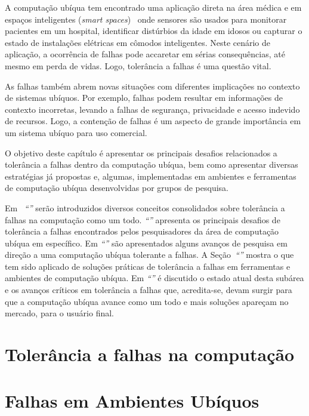 \documentclass{SBCbookchapter}
\begin{document}
A computação ubíqua tem encontrado uma aplicação direta na área médica\linebreak\cite{Bang03} e em espaços inteligentes (\emph{smart spaces})~\cite{Kidd99} onde sensores são usados para monitorar pacientes em um hospital, identificar distúrbios da idade em idosos ou capturar o estado de instalações elétricas em cômodos inteligentes. Neste cenário de aplicação, a ocorrência de falhas pode accaretar em sérias consequências, até mesmo em perda de vidas. Logo, tolerância a falhas é uma questão vital.

As falhas também abrem novas situações com diferentes implicações no contexto de sistemas ubíquos. Por exemplo, falhas podem resultar em informações de contexto incorretas, levando a falhas de segurança, privacidade e acesso indevido de recursos. Logo, a contenção de falhas é um aspecto de grande importância em um sistema ubíquo para uso comercial.

O objetivo deste capítulo é apresentar os principais desafios relacionados a tolerância a falhas dentro da computação ubíqua, bem como apresentar diversas estratégias já propostas e, algumas, implementadas em ambientes e ferramentas de computação ubíqua desenvolvidas por grupos de pesquisa.

Em ~\emph{``''} serão introduzidos diversos conceitos consolidados sobre tolerância a falhas na computação como um todo. \emph{``''} apresenta os principais desafios de tolerância a falhas encontrados pelos pesquisadores da área de computação ubíqua em específico. Em \emph{``''} são apresentados alguns avanços de pesquisa em direção a uma computação ubíqua tolerante a falhas. A Seção~\emph{``''} mostra o que tem sido aplicado de soluções práticas de tolerância a falhas em ferramentas e ambientes de computação ubíqua. Em \emph{``''} é discutido o estado atual desta subárea e os avanços críticos em tolerância a falhas que, acredita-se, devam surgir para que a computação ubíqua avance como um todo e mais soluções apareçam no mercado, para o usuário final.


\section{Tolerância a falhas na computação}
\label{sec:falhas_comp}


\section{Falhas em Ambientes Ubíquos}
\label{sec:falhas_ubicomp}

\end{document}
